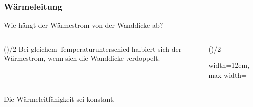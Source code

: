 \begin{frame}[t]
\frametitle{Wärmeleitung}

Wie hängt der Wärmestrom von der Wanddicke ab?

\begin{columns}[T,onlytextwidth]
\begin{column}{\dimexpr(\columnsep)/2\relax}
Bei gleichem Temperaturunterschied halbiert sich der Wärmestrom, wenn sich die Wanddicke verdoppelt.
\end{column}

\begin{column}{\dimexpr(\columnsep)/2\relax}
\par\begingroup\centering\noindent\begin{adjustbox}{width=12em,max width=\linewidth}


\end{adjustbox}\par
\par\endgroup
\end{column}
\end{columns}

Die Wärmeleitfähigkeit sei konstant.

\end{frame}

